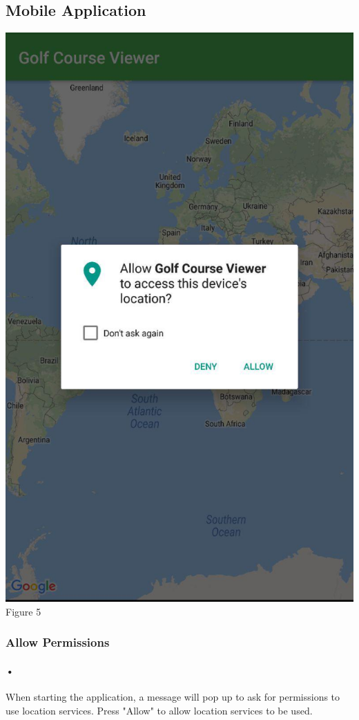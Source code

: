 \documentclass{article}
\begin{document}
	\subsection{Mobile Application}
	    \includegraphics[scale=0.2]{mobileapp-permissions.jpg}
	    \linebreak
	    Figure 5
	\subsubsection{Allow Permissions}
	
	\paragraph{•}
	When starting the application, a message will pop up to ask for permissions to use location services. Press "Allow" to allow location services to be used.
	
\end{document}

